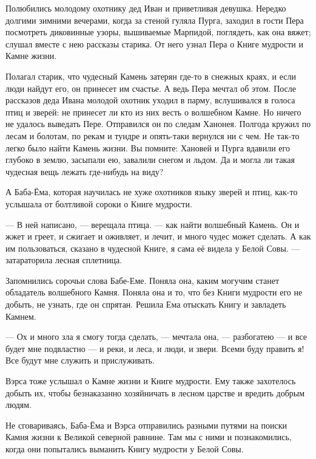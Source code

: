 \documentclass[oneside,final,14pt]{extreport}
\begin{document}
		Полюбились молодому охотнику дед Иван и приветливая девушка. Нередко долгими зимними вечерами, когда за стеной гуляла Пурга, заходил в гости Пера посмотреть диковинные узоры, вышиваемые Марпидой, поглядеть, как она вяжет; слушал вместе с нею рассказы старика. От него узнал Пера о Книге мудрости и Камне жизни.
		
		Полагал старик, что чудесный Камень затерян где-то в снежных краях, и если люди найдут его, он принесет им счастье. А ведь Пера мечтал об этом. После рассказов деда Ивана молодой охотник уходил в парму, вслушивался в голоса птиц и зверей: не принесет ли кто из них весть о волшебном Камне. Но ничего не удалось выведать Пере. Отправился он по следам Ханонея. Полгода кружил по лесам и болотам, по рекам и тундре и опять-таки вернулся ни с чем. Не так-то легко было найти Камень жизни. Вы помните: Хановей и Пурга вдавили его глубоко в землю, засыпали ею, завалили снегом и льдом. Да и могла ли такая чудесная вещь лежать где-нибудь на виду?
		
		А Баба-Ёма, которая научилась не хуже охотников языку зверей и птиц, как-то услышала от болтливой сороки о Книге мудрости.
		
		— В ней написано, — верещала птица. — как найти волшебный Камень. Он и жжет и греет, и сжигает и оживляет, и лечит, и много чудес может сделать. А как им пользоваться, сказано в чудесной Книге, я сама её видела у Белой Совы. — затараторила лесная сплетница.
		
		Запомнились сорочьи слова Бабе-Еме. Поняла она, каким могучим станет обладатель волшебного Камня. Поняла она и то, что без Книги мудрости его не добыть, не узнать, где он спрятан. Решила Ема отыскать Книгу и завладеть Камнем.
		
		— Ох и много зла я смогу тогда сделать, — мечтала она, — разбогатею — и все будет мне подвластно — и реки, и леса, и люди, и звери. Всеми буду править я! Все будут мне служить и прислуживать.
		
		Вэрса тоже услышал о Камне жизни и Книге мудрости. Ему также захотелось добыть их, чтобы безнаказанно хозяйничать в лесном царстве и вредить добрым людям.
		
		Не сговариваясь, Баба-Ёма и Вэрса отправились разными путями на поиски Камня жизни к Великой северной равнине. Там мы с ними и познакомились, когда они попытались выманить Книгу мудрости у Белой Совы.
		
	
\end{document}
